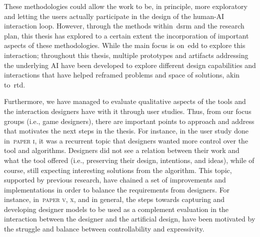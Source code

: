 
These methodologies could allow the work to be, in principle, more exploratory and letting the users actually participate in the design of the human-AI interaction loop. However, through the methods within~\acrshort{dsrm} and the research plan, this thesis has explored to a certain extent the incorporation of important aspects of these methodologies. While the main focus is on~\acrshort{edd} to explore this interaction; throughout this thesis, multiple prototypes and artifacts addressing the underlying AI have been developed to explore different design capabilities and interactions that have helped reframed problems and space of solutions, akin to~\acrshort{rtd}.

Furthermore, we have managed to evaluate qualitative aspects of the tools and the interaction designers have with it through user studies. Thus, from our focus groups (i.e., game designers), there are important points to approach and address that motivates the next steps in the thesis. For instance, in the user study done in~\textsc{paper i}, it was a recurrent topic that designers wanted more control over the tool and algorithms. Designers did not see a relation between their work and what the tool offered (i.e., preserving their design, intentions, and ideas), while of course, still expecting interesting solutions from the algorithm. This topic, supported by previous research, have chained a set of improvements and implementations in order to balance the requirements from designers. For instance, in~\textsc{paper v, x}, and in general, the steps towards capturing and developing designer models to be used as a complement evaluation in the interaction between the designer and the artificial design, have been motivated by the struggle and balance between controllability and expressivity.  




